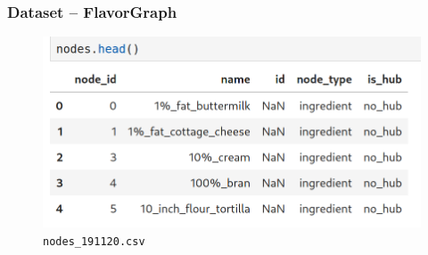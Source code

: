 \documentclass{beamer}
\begin{document}
\begin{frame}
	\frametitle{Dataset -- FlavorGraph}
	\begin{figure}[H]
		\centering
		\includegraphics[width=\linewidth]{img/nodes_head.png}
		\caption{\texttt{nodes\_191120.csv}}
	\end{figure}
\end{frame}
\end{document}

